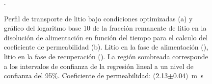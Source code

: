 \begin{figure}[H]
    \centering
    \caption[Perfil de transporte de litio del sistema optimizado.]{Perfil de transporte de litio bajo condiciones optimizadas (a) y gráfico del logaritmo base 10 de la fracción remanente de litio en la disolución de alimentación en función del tiempo para el calculo del coeficiente de permeabilidad (b). Litio en la fase de alimentación (\protect\squareblck), litio en la fase de recuperación (\protect\squarewht). La región sombreada corresponde a los intervalos de confianza de la regresión lineal a un nivel de confianza del 95\%. Coeficiente de permeabilidad: (2.13$\pm$0.04)~m~s\mnn}.
    \label{fig:optim10}
\end{figure}

\clearpage

\clearpage{}